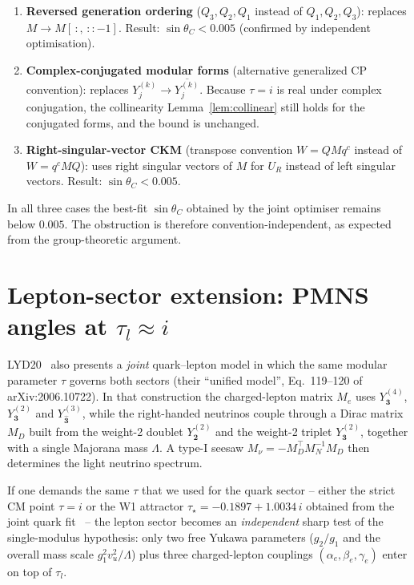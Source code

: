 \documentclass[a4paper,11pt]{article}
\newcommand{\sinTC}{\sin\theta_C}
\begin{document}
\begin{enumerate}
\item \textbf{Reversed generation ordering} ($Q_3,Q_2,Q_1$ instead of
  $Q_1,Q_2,Q_3$): replaces $M\to M[\,:,\,::-1]$.  Result:
  $\sinTC < 0.005$ (confirmed by independent optimisation).

\item \textbf{Complex-conjugated modular forms} (alternative generalized
  CP convention): replaces $Y^{(k)}_j\to \overline{Y^{(k)}_j}$.
  Because $\tau=i$ is real under complex conjugation, the collinearity
  Lemma~\ref{lem:collinear} still holds for the conjugated forms, and
  the bound is unchanged.

\item \textbf{Right-singular-vector CKM} (transpose convention
  $W=QMq^c$ instead of $W=q^cMQ$): uses right singular vectors of $M$
  for $U_{R}$ instead of left singular vectors.  Result:
  $\sinTC < 0.005$.
\end{enumerate}

In all three cases the best-fit $\sinTC$ obtained by the joint
optimiser remains below $0.005$.  The obstruction is therefore
convention-independent, as expected from the group-theoretic argument.

\section{Lepton-sector extension: PMNS angles at $\tau_l\approx i$}
\label{sec:pmns}

LYD20~\cite{LYD20} also presents a \emph{joint} quark--lepton model in
which the same modular parameter $\tau$ governs both sectors (their
``unified model'', Eq.~119--120 of arXiv:2006.10722).  In that
construction the charged-lepton matrix $M_e$ uses
$Y^{(4)}_{\mathbf{3}}$, $Y^{(2)}_{\mathbf{3}}$ and
$Y^{(3)}_{\hat{\mathbf{3}}}$, while the right-handed neutrinos couple
through a Dirac matrix $M_D$ built from the weight-2 doublet
$Y^{(2)}_{\mathbf{2}}$ and the weight-2 triplet $Y^{(2)}_{\mathbf{3}}$,
together with a single Majorana mass $\Lambda$.  A type-I seesaw
$M_\nu = - M_D^\top M_N^{-1} M_D$ then determines the light neutrino
spectrum.

If one demands the same $\tau$ that we used for the quark sector --
either the strict CM point $\tau=i$ or the W1 attractor
$\tau_\star = -0.1897 + 1.0034\,i$ obtained from the joint
quark fit~\cite{Wave1Note} -- the lepton sector becomes an
\emph{independent} sharp test of the single-modulus hypothesis: only
two free Yukawa parameters ($g_2/g_1$ and the overall mass scale
$g_1^2 v_u^2/\Lambda$) plus three charged-lepton couplings
$(\alpha_e,\beta_e,\gamma_e)$ enter on top of $\tau_l$.
\end{document}
